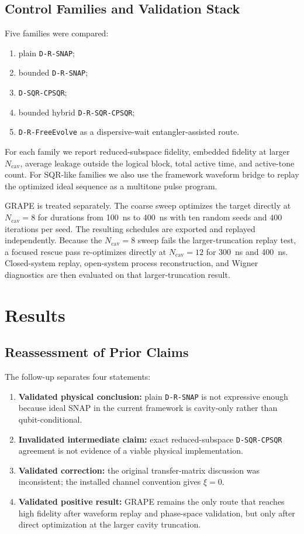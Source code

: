 \documentclass[aps,pra,twocolumn,reprint,amsmath,amssymb]{revtex4-2}
\begin{document}
\subsection{Control Families and Validation Stack}
Five families were compared:
\begin{enumerate}
  \item plain \texttt{D-R-SNAP};
  \item bounded \texttt{D-R-SNAP};
  \item \texttt{D-SQR-CPSQR};
  \item bounded hybrid \texttt{D-R-SQR-CPSQR};
  \item \texttt{D-R-FreeEvolve} as a dispersive-wait entangler-assisted route.
\end{enumerate}
For each family we report reduced-subspace fidelity, embedded fidelity at
larger $N_{\mathrm{cav}}$, average leakage outside the logical block, total
active time, and active-tone count. For SQR-like families we also use the
framework waveform bridge to replay the optimized ideal sequence as a
multitone pulse program.

GRAPE is treated separately. The coarse sweep optimizes the target directly at
$N_{\mathrm{cav}}=8$ for durations from \SI{100}{ns} to \SI{400}{ns} with ten
random seeds and 400 iterations per seed. The resulting schedules are exported
and replayed independently. Because the $N_{\mathrm{cav}}=8$ sweep fails the
larger-truncation replay test, a focused rescue pass re-optimizes directly at
$N_{\mathrm{cav}}=12$ for \SI{300}{ns} and \SI{400}{ns}. Closed-system replay,
open-system process reconstruction, and Wigner diagnostics are then evaluated
on that larger-truncation result.

\section{Results}
\subsection{Reassessment of Prior Claims}
The follow-up separates four statements:
\begin{enumerate}
  \item \textbf{Validated physical conclusion:} plain
  \texttt{D-R-SNAP} is not expressive enough because ideal SNAP in the current
  framework is cavity-only rather than qubit-conditional.
  \item \textbf{Invalidated intermediate claim:} exact reduced-subspace
  \texttt{D-SQR-CPSQR} agreement is not evidence of a viable physical
  implementation.
  \item \textbf{Validated correction:} the original transfer-matrix discussion
  was inconsistent; the installed channel convention gives $\xi=0$.
  \item \textbf{Validated positive result:} GRAPE remains the only route that
  reaches high fidelity after waveform replay and phase-space validation, but
  only after direct optimization at the larger cavity truncation.
\end{enumerate}
\end{document}
